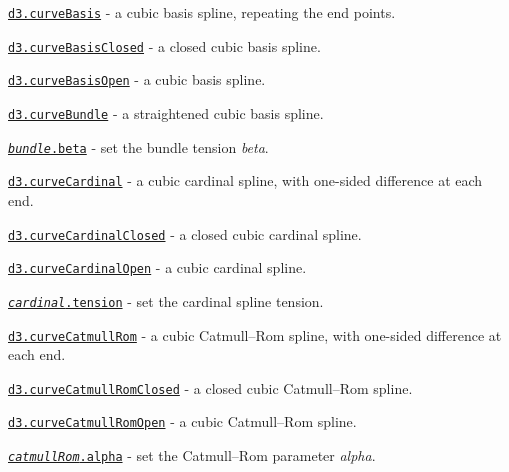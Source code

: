 \begin{DoxyItemize}
\item \href{https://github.com/d3/d3-shape/blob/master/README.md#curveBasis}{\tt d3.\+curve\+Basis} -\/ a cubic basis spline, repeating the end points.
\item \href{https://github.com/d3/d3-shape/blob/master/README.md#curveBasisClosed}{\tt d3.\+curve\+Basis\+Closed} -\/ a closed cubic basis spline.
\item \href{https://github.com/d3/d3-shape/blob/master/README.md#curveBasisOpen}{\tt d3.\+curve\+Basis\+Open} -\/ a cubic basis spline.
\item \href{https://github.com/d3/d3-shape/blob/master/README.md#curveBundle}{\tt d3.\+curve\+Bundle} -\/ a straightened cubic basis spline.
\item \href{https://github.com/d3/d3-shape/blob/master/README.md#bundle_beta}{\tt {\itshape bundle}.beta} -\/ set the bundle tension {\itshape beta}.
\item \href{https://github.com/d3/d3-shape/blob/master/README.md#curveCardinal}{\tt d3.\+curve\+Cardinal} -\/ a cubic cardinal spline, with one-\/sided difference at each end.
\item \href{https://github.com/d3/d3-shape/blob/master/README.md#curveCardinalClosed}{\tt d3.\+curve\+Cardinal\+Closed} -\/ a closed cubic cardinal spline.
\item \href{https://github.com/d3/d3-shape/blob/master/README.md#curveCardinalOpen}{\tt d3.\+curve\+Cardinal\+Open} -\/ a cubic cardinal spline.
\item \href{https://github.com/d3/d3-shape/blob/master/README.md#cardinal_tension}{\tt {\itshape cardinal}.tension} -\/ set the cardinal spline tension.
\item \href{https://github.com/d3/d3-shape/blob/master/README.md#curveCatmullRom}{\tt d3.\+curve\+Catmull\+Rom} -\/ a cubic Catmull–\+Rom spline, with one-\/sided difference at each end.
\item \href{https://github.com/d3/d3-shape/blob/master/README.md#curveCatmullRomClosed}{\tt d3.\+curve\+Catmull\+Rom\+Closed} -\/ a closed cubic Catmull–\+Rom spline.
\item \href{https://github.com/d3/d3-shape/blob/master/README.md#curveCatmullRomOpen}{\tt d3.\+curve\+Catmull\+Rom\+Open} -\/ a cubic Catmull–\+Rom spline.
\item \href{https://github.com/d3/d3-shape/blob/master/README.md#catmullRom_alpha}{\tt {\itshape catmull\+Rom}.alpha} -\/ set the Catmull–\+Rom parameter {\itshape alpha}.

\end{DoxyItemize}
